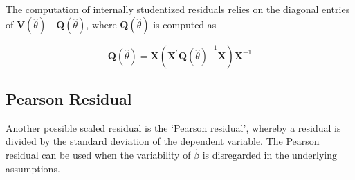 \documentclass[Main.tex]{subfiles}
\begin{document}
The computation of internally studentized residuals relies on the diagonal entries of $\boldsymbol{V} (\hat{\theta})$ - $\boldsymbol{Q} (\hat{\theta})$, where $\boldsymbol{Q} (\hat{\theta})$ is computed as

\[ \boldsymbol{Q} (\hat{\theta}) = \boldsymbol{X} ( \boldsymbol{X}^{\prime}\boldsymbol{Q} (\hat{\theta})^{-1}\boldsymbol{X})\boldsymbol{X}^{-1} \]

\subsection{Pearson Residual}%

Another possible scaled residual is the  `Pearson residual', whereby a residual is divided by the standard deviation of the dependent variable. The Pearson residual can be used when the variability of $\hat{\beta}$ is disregarded in the underlying assumptions.


\end{document}
